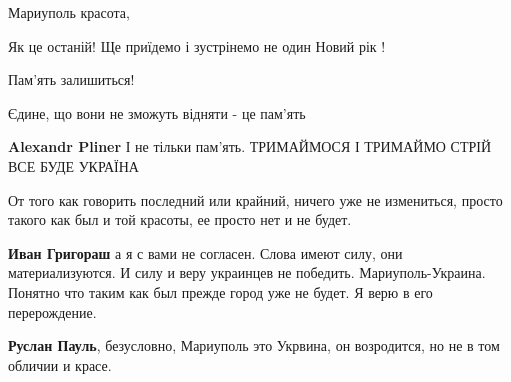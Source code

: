 \begin{itemize}
Мариуполь красота,

Як це останій! Ще приїдемо і зустрінемо не один Новий рік !

Пам'ять залишиться!

Єдине, що вони не зможуть відняти - це пам'ять

\begin{itemize} %
\textbf{Alexandr Pliner} І не тільки пам'ять. ТРИМАЙМОСЯ І ТРИМАЙМО СТРІЙ ВСЕ БУДЕ УКРАЇНА 💙💛🇺🇦
\end{itemize} %


От того как говорить последний или крайний, ничего уже не измениться, просто
такого как был и той красоты, ее просто нет и не будет.

\begin{itemize} %
\textbf{Иван Григораш} а я с вами не согласен. Слова имеют силу, они материализуются. И силу и веру украинцев не победить. Мариуполь-Украина. Понятно что таким как был прежде город уже не будет. Я верю в его перерождение.

\textbf{Руслан Пауль}, безусловно, Мариуполь это Укрвина, он возродится, но не в том обличии и красе.
\end{itemize} %

\end{itemize} %
